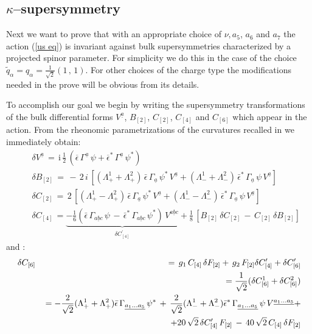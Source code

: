 \documentclass[a4paper,11pt]{article}
\newcommand{\ft}[2]{{\textstyle\frac{#1}{#2}}}
\def\tilde{\widetilde}
\begin{document}
\subsection{$\kappa$--supersymmetry}
Next we want to prove that with an appropriate choice of $\nu, a_5$, $a_6$ and $a_7$ the action (\ref{us eq}) is invariant against bulk
supersymmetries characterized by a projected spinor parameter. For
simplicity we do this in the case of the choice $\tilde{q}_{\alpha} = q_{\alpha}  = \frac{1}{\sqrt{2}}(1 \, , \,
1)$. For other choices of the charge type the modifications needed in
the prove will be obvious from its details.
\par
To accomplish our goal we begin by writing the supersymmetry transformations of the
bulk differential forms $V^{\underline{a}}$, $B_{[2]}$, $C_{[2]}$,
$C_{[4]}$ and $C_{[6]}$ which appear in the action. From the rheonomic
parametrizations of the curvatures recalled in \cite{noidued3} we immediately
obtain:
\begin{eqnarray}
&&\delta V^{\underline{a}}\, = \, \mbox{i}\, \ft 1 2 \, \left( \overline{\epsilon} \,
\Gamma^{\underline{a}} \, \psi + \overline{\epsilon}^{*} \,
\Gamma^{\underline{a}} \, \psi^{*}\right)   \nonumber\\
&&\delta B_{[2]} \, = \, - \, 2 \, i \, [(\Lambda^{1}_{+} +\Lambda^{2}_{+}) \,
{\bar\epsilon} \, \Gamma_{\underline{a}} \, \psi^{*} \,
V^{\underline{a}}+(\Lambda^{1}_{-} +\Lambda^{2}_{-}) \, {\bar\epsilon}^{*} \,
\Gamma_{\underline{a}} \, \psi \, V^{\underline{a}}] \nonumber\\
&&\delta C_{[2]} \, = \, 2 \, [(\Lambda^{1}_{+} -\Lambda^{2}_{+}) \, {\bar\epsilon} \,
\Gamma_{\underline{a}} \, \psi^{*} \,
V^{\underline{a}}+(\Lambda^{1}_{-} -\Lambda^{2}_{-}) \, {\bar\epsilon}^{*} \,
\Gamma_{\underline{a}} \, \psi \, V^{\underline{a}}] \nonumber\\
&&\delta C_{[4]} \, = \underbrace{ -\frac{1}{6} ( {\bar\epsilon} \, \Gamma_{\underline{abc}}
\, \psi \, - \, {\bar\epsilon}^{*} \, \Gamma_{\underline{abc}} \, \psi^{*})
\, V^{\underline{abc}} }_{\delta C_{[4]}^{\prime}} + \frac{1}{8} \,  [ B_{[2]} \,
\delta C_{[2]} \, - \, C_{[2]} \, \delta B_{[2]} ]
\label{susy tran}
\end{eqnarray}
and :
\begin{eqnarray}
\delta C_{[6]} \, && = \, g_{1} \, C_{[4]} \, \delta F_{[2]} + \, g_{2} \,F_{[2]} \delta C_{[4]}^{\prime} + \delta C_{[6]}^{\prime} \nonumber \\
&& = \frac{1}{\sqrt{2}}(\delta C_{[6]}^{1} + \delta C_{[6]}^{2}) \nonumber \\
&& = - \frac{2}{\sqrt{2}}(\Lambda^{1}_{+} + \Lambda^{2}_{+}) {\bar\epsilon} \, \Gamma_{\underline{a_{1} \dots a_{5}}}\, \psi^{*} \, + \, \frac{2}{\sqrt{2}} (\Lambda^{1}_{-} + \Lambda^{2}_{-}) {\bar\epsilon}^{*} \, \Gamma_{\underline{a_{1} \dots a_{5}}} \, \psi \, V^{\underline{a_{1} \dots a_{5}}}+ \nonumber \\
&& \hspace{0.45cm} + 20 \, \sqrt{2} \, \delta C_{[4]}^{\prime} \, F_{[2]} \, - \, 40 \, \sqrt{2} \, C_{[4]} \, \delta F_{[2]}
\label{var.ci.6}
\end{eqnarray}
\end{document}

